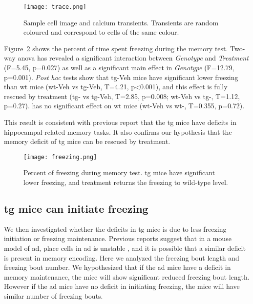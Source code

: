 \begin{figure}[h]
    \texttt{[image: trace.png]}
    \caption[Sample cell image and calcium transients.]{Sample cell image and calcium transients. Transients are random coloured and correspond to cells of the same colour. \label{f.ad.trace}}
\end{figure}


Figure~\ref{f.ad.freezing} shows the percent of time spent freezing during the memory test. Two-way \gls{anova} has revealed a significant interaction between \textit{Genotype} and \textit{Treatment} (F=5.45, p=0.027) as well as a significant main effect in \textit{Genotype} (F=12.79, p=0.001).  \textit{Post hoc} tests show that \gls{tg}-Veh mice have significant lower freezing than \gls{wt} mice (\gls{wt}-Veh vs \gls{tg}-Veh, T=4.21, p<0.001), and this effect is fully rescued by \tglu{} treatment (\gls{tg}-\glu{} vs \gls{tg}-Veh, T=2.85, p=0.008; \gls{wt}-Veh vs \gls{tg}-\glu, T=1.12, p=0.27). \tglu{} has no significant effect on \gls{wt} mice (\gls{wt}-Veh vs \gls{wt}-\glu, T=0.355, p=0.72). 

This result is consistent with previous report \citep{palmer11, zhou16} that the \gls{tg} mice have deficits in hippocampal-related memory tasks. It also confirms our hypothesis that the memory deficit of \gls{tg} mice can be rescued by \tglu{} treatment. 

\begin{figure}[h]
    \texttt{[image: freezing.png]}
    \caption[Percent of freezing during memory test.]{Percent of freezing during memory test. \Gls{tg} mice have significant lower freezing, and \tglu{} treatment returns the freezing to wild-type level. \label{f.ad.freezing}}
\end{figure}

\subsection{\Gls{tg} mice can initiate freezing}
We then investigated whether the deficits in \gls{tg} mice is due to less freezing initiation or freezing maintenance. Previous reports suggest that in a mouse model of \gls{ad}, place cells in \gls{ad} is unstable \citep{cheng13}, and it is possible that a similar deficit is present in memory encoding. Here we analyzed the freezing bout length and freezing bout number. We hypothesized that if the \gls{ad} mice have a deficit in memory maintenance, the mice will show significant reduced freezing bout length. However if the \gls{ad} mice have no deficit in initiating freezing, the mice will have similar number of freezing bouts.

